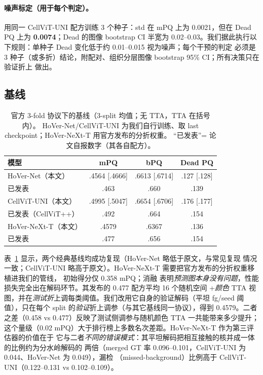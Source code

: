 \documentclass[11pt]{article}
\begin{document}
\paragraph{噪声标定（用于每个判定）。}用同一 CellViT-UNI 配方训练 3 个种子：std 在
mPQ 上为 0.0021，但在 Dead PQ 上为 \textbf{0.0074}；Dead 的图像 bootstrap CI 半宽为
0.02--0.03。我们据此执行以下规则：单种子 Dead 变化低于约 0.01--0.015 视为噪声；每个干预的判定
必须是 3 种子（或多折）结论，附配对、组织分层图像 bootstrap 95\% CI；所有决策只在验证折上
做出。

\subsection{基线}
\label{sec:baselines}

\begin{table}[t]
\centering\small
\caption{官方 3-fold 协议下的基线（3-split 均值；无 TTA，TTA 在括号内）。
HoVer-Net/CellViT-UNI 为我们自行训练、取 last checkpoint；HoVer-NeXt-T 用官方发布的分折权重。
“已发表”= 论文自报数字（其各自配方）。}
\label{tab:baselines}
\begin{tabular}{lccc}
\toprule
模型 & mPQ & bPQ & Dead PQ \\
\midrule
HoVer-Net（本文）      & .4564 [.4666] & .6613 [.6714] & .127 [.128] \\
\quad 已发表            & .463 & .660 & .139 \\
CellViT-UNI（本文）    & .4995 [.5047] & .6654 [.6706] & .176 [.177] \\
\quad 已发表（CellViT++）& .492 & .664 & .154 \\
HoVer-NeXt-T（本文）   & .4579 & .6367 & .136 \\
\quad 已发表            & .477 & .656 & .154 \\
\bottomrule
\end{tabular}
\end{table}

表~\ref{tab:baselines} 显示，两个经典基线均成功复现（HoVer-Net 略低于原文，与常见复现
情况一致；CellViT-UNI 略高于原文）。HoVer-NeXt-T 需要把官方发布的分折权重移植进我们的管线，
初始得分仅 0.358 mPQ；消融
表明\emph{预测图本身没有问题}，性能损失完全出在解码环节。其发布的 0.477 配方平均 16 个随机空间
+\emph{颜色} TTA 视图，并在\emph{测试折}上调每类阈值。我们改用它自身的验证解码（平坦
fg/seed 阈值），只在每个 split 的\emph{验证}折上调参（与其它基线同一协议），得到
0.4579。二者之差（0.458 vs 0.477）反映了测试侧调参与随机颜色 TTA 一共能带来多少提升；
这个量级（0.02 mPQ）大于排行榜上多数名次差距。HoVer-NeXt-T 作为第三评估器的价值在于
它与二者\emph{不同的错误模式}：其平坦解码把相互接触的核并成一体的比例约为分水岭解码的
两倍（merged GT 率 0.096--0.101，CellViT-UNI 为 0.044、HoVer-Net 为 0.049），漏检
（missed-background）比例高于 CellViT-UNI（0.122--0.131 vs 0.102--0.109）。
\end{document}
